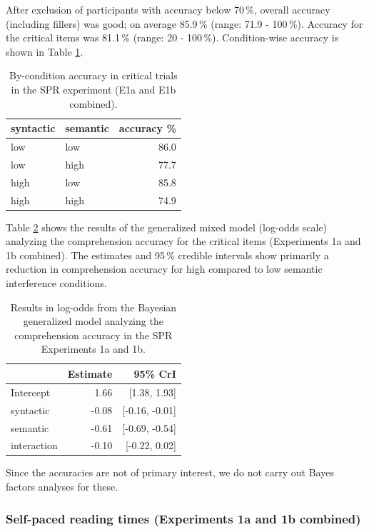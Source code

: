 \documentclass[a4paper, man, floatsintext]{apa7}
\begin{document}
After exclusion of participants with accuracy below 70\,\%, overall accuracy (including fillers) was good; on average 85.9\,\% (range: 71.9 - 100\,\%). Accuracy for the critical items was 81.1\,\% (range: 20 - 100\,\%). Condition-wise accuracy is shown in Table \ref{tab:spr_acc}.

\begin{table}[]
    \caption{By-condition accuracy in critical trials in the SPR experiment (E1a and E1b combined).}
    \label{tab:spr_acc}
    \centering
    \begin{tabular}{llr}
    \toprule
    syntactic & semantic & accuracy \%\\
    \midrule
        low &  low & 86.0\\
        low &  high & 77.7\\
        high &  low & 85.8\\
        high &  high & 74.9\\
    \bottomrule
    \end{tabular}
\end{table}

Table \ref{tab:spr_acc_mod} shows the results of the generalized mixed model (log-odds scale) analyzing the comprehension accuracy for the critical items (Experiments 1a and 1b combined). The estimates and 95\,\% credible intervals show primarily a reduction in comprehension accuracy for high compared to low semantic interference conditions.

\begin{table}[H]
    \caption{Results in log-odds from the Bayesian generalized model analyzing the comprehension accuracy in the SPR Experiments 1a and 1b.}
    \label{tab:spr_acc_mod}
    \centering
    \begin{tabular}{lrr}
    \toprule
    & Estimate &  95\% CrI  \\
    \midrule
Intercept& 1.66 &   [1.38, 1.93]\\
syntactic& -0.08 &  [-0.16, -0.01]\\
semantic&  -0.61 & [-0.69, -0.54]\\
interaction& -0.10&  [-0.22, 0.02]\\
    \bottomrule
    \end{tabular}
\end{table}

Since the accuracies are not of primary interest, we do not carry out Bayes factors analyses for these.

\subsubsection{Self-paced reading times (Experiments 1a and 1b combined)}
\end{document}
